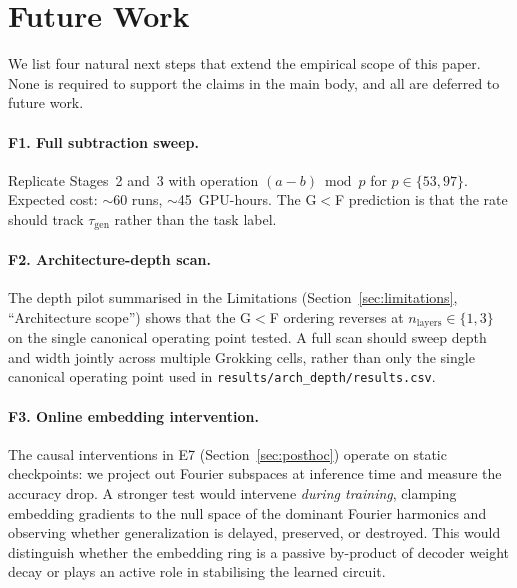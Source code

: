 \documentclass{article}
\newcommand{\taug}{\tau_{\mathrm{gen}}}
\begin{document}
\section{Future Work}
\label{app:future_work}

We list four natural next steps that extend the empirical scope of
this paper. None is required to support the claims in the main
body, and all are deferred to future work.

\paragraph{F1. Full subtraction sweep.}
Replicate Stages~2 and~3 with operation $(a-b)\bmod p$ for
$p\in\{53,97\}$. Expected cost: $\sim$60 runs, $\sim$45~GPU-hours.
The G$<$F prediction is that the rate should track $\taug$ rather
than the task label.

\paragraph{F2. Architecture-depth scan.}
The depth pilot summarised in the Limitations (Section~\ref{sec:limitations},
``Architecture scope'') shows that the G$<$F ordering reverses at
$n_{\mathrm{layers}}\in\{1,3\}$ on the single canonical operating point
tested.
A full scan should sweep depth and width jointly across multiple
Grokking cells, rather than only the single canonical operating
point used in \texttt{results/arch\_depth/results.csv}.

\paragraph{F3. Online embedding intervention.}
The causal interventions in E7 (Section~\ref{sec:posthoc}) operate
on static checkpoints: we project out Fourier subspaces at inference
time and measure the accuracy drop.
A stronger test would intervene \emph{during training}, clamping
embedding gradients to the null space of the dominant Fourier
harmonics and observing whether generalization is delayed, preserved,
or destroyed.
This would distinguish whether the embedding ring is a passive
by-product of decoder weight decay or plays an active role in
stabilising the learned circuit.
\end{document}
